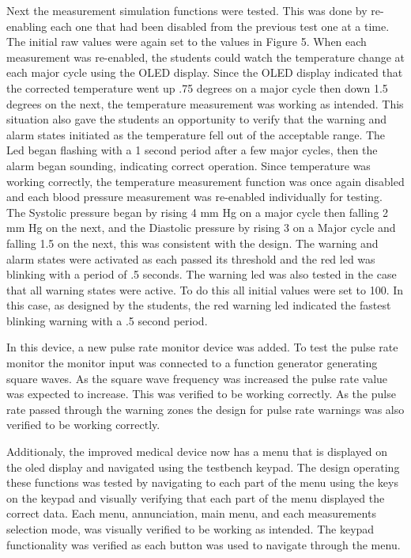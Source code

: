 \documentclass[12pt]{article} %
\begin{document}
    Next the measurement simulation functions were tested. This was done by
    re-enabling each one that had been disabled from the previous test one at a
    time. The initial raw values were again set to the values in Figure 5. When
    each measurement was re-enabled, the students could watch the temperature change
    at each major cycle using the OLED display. Since the OLED display indicated
    that the corrected temperature went up .75 degrees on a major cycle then down
    1.5 degrees on the next, the temperature measurement was working as intended.
    This situation also gave the students an opportunity to verify that the warning
    and alarm states initiated as the temperature fell out of the acceptable range.
    The Led began flashing with a 1 second period after a few major cycles, then
    the alarm began sounding, indicating correct operation. Since temperature was
    working correctly, the temperature measurement function was once again disabled
    and each blood pressure measurement was
    re-enabled individually for testing. The Systolic pressure began by rising 4 mm
    Hg on a major cycle then falling 2 mm Hg on the next, and the Diastolic
    pressure by rising 3 on a Major cycle and falling 1.5 on the next, this was
    consistent with the design. The warning and alarm states were activated as each
    passed its threshold and the red led was blinking with a period of .5 seconds.
    The warning led was also tested in the case that all warning states were
    active. To do this all initial values were set to 100. In this case, as
    designed by the students, the red warning led indicated the fastest blinking
    warning with a .5 second period. 
    
    In this device, a new pulse rate monitor device was added. To test the pulse rate monitor  the monitor input was connected to a function generator generating square waves. As the square wave frequency was increased the pulse rate value was expected to increase. This was verified to be working correctly. As the pulse rate passed through the warning zones the design for pulse rate warnings was also verified to be working correctly.
    
    Additionaly, the improved medical device now has a menu that is displayed on the oled display and navigated using the testbench keypad. The design operating these functions was tested by navigating to each part of the menu using the keys on the keypad and visually verifying that each part of the menu displayed the correct data. Each menu, annunciation, main menu, and each measurements selection mode, was visually verified to be working as intended. The keypad functionality was verified as each button was used to navigate through the menu.
    
\end{document}
